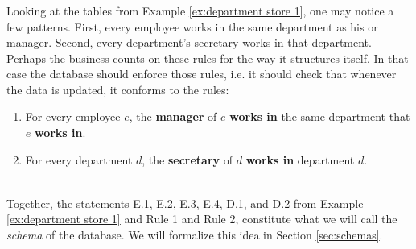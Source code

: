 \documentclass[CT4S-EN-RU]{subfiles}
\begin{document}
\begin{exampleRUS}\label{ex:department store 1}
\end{exampleRUS}


\subsubsection{}

\begin{blockENG}
Looking at the tables from Example \ref{ex:department store 1}, one may notice a few patterns. First, every employee works in the same department as his or manager. Second, every department's secretary works in that department. Perhaps the business counts on these rules for the way it structures itself. In that case the database should enforce those rules, i.e. it should check that whenever the data is updated, it conforms to the rules: 

\begin{enumerate}
\item For every employee $e$, the {\bf manager} of $e$ {\bf works in} the same department that $e$ {\bf works in}.
\item For every department $d$, the {\bf secretary} of $d$ {\bf works in} department $d$.
\end{enumerate}
\vspace{-.3in}\begin{align}\label{dia:rules}\end{align}\vspace{-.3in}

Together, the statements E.1, E.2, E.3, E.4, D.1, and D.2 from Example \ref{ex:department store 1} and Rule 1 and Rule 2, constitute what we will call the {\em schema} of the database. We will formalize this idea in Section \ref{sec:schemas}.
\end{blockENG}

\begin{blockRUS}
\end{blockRUS}


\subsubsection{}
\end{document}
